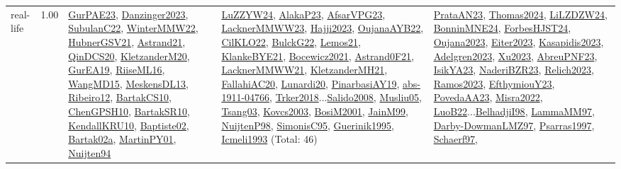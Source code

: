 {\begin{longtable}{p{3cm}r>{\raggedright\arraybackslash}p{6cm}>{\raggedright\arraybackslash}p{6cm}>{\raggedright\arraybackslash}p{8cm}}
\index{real-life}\index{Benchmarks!real-life}real-life &  1.00 & \hyperref[detail:GurPAE23]{GurPAE23}, \hyperref[detail:Danzinger2023]{Danzinger2023}, \hyperref[detail:SubulanC22]{SubulanC22}, \hyperref[detail:WinterMMW22]{WinterMMW22}, \hyperref[detail:HubnerGSV21]{HubnerGSV21}, \hyperref[detail:Astrand21]{Astrand21}, \hyperref[detail:QinDCS20]{QinDCS20}, \hyperref[detail:KletzanderM20]{KletzanderM20}, \hyperref[detail:GurEA19]{GurEA19}, \hyperref[detail:RiiseML16]{RiiseML16}, \hyperref[detail:WangMD15]{WangMD15}, \hyperref[detail:MeskensDL13]{MeskensDL13}, \hyperref[detail:Ribeiro12]{Ribeiro12}, \hyperref[detail:BartakCS10]{BartakCS10}, \hyperref[detail:ChenGPSH10]{ChenGPSH10}, \hyperref[detail:BartakSR10]{BartakSR10}, \hyperref[detail:KendallKRU10]{KendallKRU10}, \hyperref[detail:Baptiste02]{Baptiste02}, \hyperref[detail:Bartak02a]{Bartak02a}, \hyperref[detail:MartinPY01]{MartinPY01}, \hyperref[detail:Nuijten94]{Nuijten94} & \hyperref[detail:LuZZYW24]{LuZZYW24}, \hyperref[detail:AlakaP23]{AlakaP23}, \hyperref[detail:AfsarVPG23]{AfsarVPG23}, \hyperref[detail:LacknerMMWW23]{LacknerMMWW23}, \hyperref[detail:Hajji2023]{Hajji2023}, \hyperref[detail:OujanaAYB22]{OujanaAYB22}, \hyperref[detail:CilKLO22]{CilKLO22}, \hyperref[detail:BulckG22]{BulckG22}, \hyperref[detail:Lemos21]{Lemos21}, \hyperref[detail:KlankeBYE21]{KlankeBYE21}, \hyperref[detail:Bocewicz2021]{Bocewicz2021}, \hyperref[detail:Astrand0F21]{Astrand0F21}, \hyperref[detail:LacknerMMWW21]{LacknerMMWW21}, \hyperref[detail:KletzanderMH21]{KletzanderMH21}, \hyperref[detail:FallahiAC20]{FallahiAC20}, \hyperref[detail:Lunardi20]{Lunardi20}, \hyperref[detail:PinarbasiAY19]{PinarbasiAY19}, \hyperref[detail:abs-1911-04766]{abs-1911-04766}, \hyperref[detail:Trker2018]{Trker2018}...\hyperref[detail:Salido2008]{Salido2008}, \hyperref[detail:Musliu05]{Musliu05}, \hyperref[detail:Tsang03]{Tsang03}, \hyperref[detail:Kovcs2003]{Kovcs2003}, \hyperref[detail:BosiM2001]{BosiM2001}, \hyperref[detail:JainM99]{JainM99}, \hyperref[detail:NuijtenP98]{NuijtenP98}, \hyperref[detail:SimonisC95]{SimonisC95}, \hyperref[detail:Guerinik1995]{Guerinik1995}, \hyperref[detail:Icmeli1993]{Icmeli1993} (Total: 46) & \hyperref[detail:PrataAN23]{PrataAN23}, \hyperref[detail:Thomas2024]{Thomas2024}, \hyperref[detail:LiLZDZW24]{LiLZDZW24}, \hyperref[detail:BonninMNE24]{BonninMNE24}, \hyperref[detail:ForbesHJST24]{ForbesHJST24}, \hyperref[detail:Oujana2023]{Oujana2023}, \hyperref[detail:Eiter2023]{Eiter2023}, \hyperref[detail:Kasapidis2023]{Kasapidis2023}, \hyperref[detail:Adelgren2023]{Adelgren2023}, \hyperref[detail:Xu2023]{Xu2023}, \hyperref[detail:AbreuPNF23]{AbreuPNF23}, \hyperref[detail:IsikYA23]{IsikYA23}, \hyperref[detail:NaderiBZR23]{NaderiBZR23}, \hyperref[detail:Relich2023]{Relich2023}, \hyperref[detail:Ramos2023]{Ramos2023}, \hyperref[detail:EfthymiouY23]{EfthymiouY23}, \hyperref[detail:PovedaAA23]{PovedaAA23}, \hyperref[detail:Misra2022]{Misra2022}, \hyperref[detail:LuoB22]{LuoB22}...\hyperref[detail:BelhadjiI98]{BelhadjiI98}, \hyperref[detail:LammaMM97]{LammaMM97}, \hyperref[detail:Darby-DowmanLMZ97]{Darby-DowmanLMZ97}, \hyperref[detail:Psarras1997]{Psarras1997}, \hyperref[detail:Schaerf97]{Schaerf97}, 
\end{longtable}}

